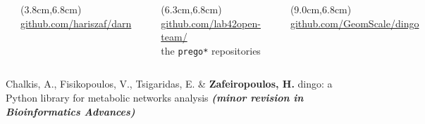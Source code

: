 \documentclass{beamer}
\begin{document}
\begin{darkframes}
\begin{frame}
\begin{columns}[onlytextwidth]

            \includegraphics[width=25mm]{resources/darn_logo.png}
            \begin{textblock*}{3cm}(3.8cm,6.8cm)
               \tiny	 \href{https://github.com/hariszaf/darn}{github.com/hariszaf/darn}
            \end{textblock*}


            \includegraphics[width=25mm]{resources/prego_logo.png}
            \begin{textblock*}{3cm}(6.3cm,6.8cm)
               \tiny	 \href{https://github.com/lab42open-team}{github.com/lab42open-team/} \\
               \tiny the \texttt{prego*} repositories
            \end{textblock*}


            \includegraphics[width=25mm]{../met_nets/resources/dingo5_transparent.png}
            \begin{textblock*}{3cm}(9.0cm,6.8cm)
               \tiny	 \href{https://github.com/GeomScale/dingo}{github.com/GeomScale/dingo}
            \end{textblock*}

      \end{columns}
   \end{frame}
   \fi

   \begin{frame}[label=bibliography]{}
      
      \begin{thebibliography}{9}

         \tiny
            Chalkis, A., Fisikopoulos, V., Tsigaridas, E. \& \textbf{Zafeiropoulos, H.} 
            dingo: a Python library for metabolic networks analysis 
            \textbf{\textit{(minor revision in Bioinformatics Advances)}}


\end{thebibliography}
\end{frame}
\end{darkframes}
\end{document}
